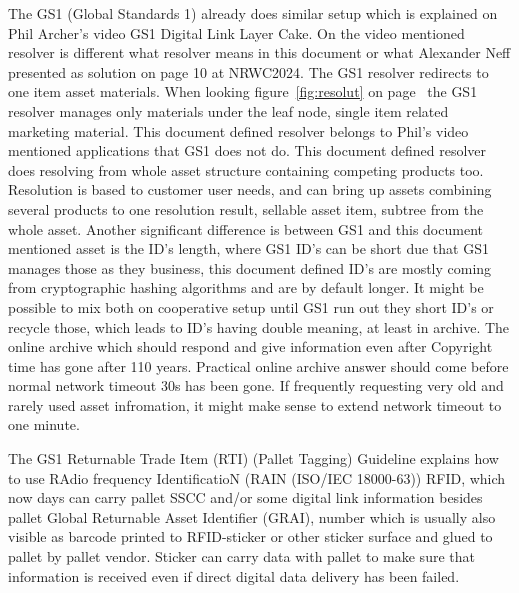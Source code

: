 The GS1 (Global Standards 1) already does similar setup which is explained
on Phil Archer's video GS1 Digital Link Layer Cake\allowbreak\cite{
GS1DigitalLink}. On the video mentioned resolver is different what resolver
means in this document or what Alexander Neff presented\allowbreak\cite{
FSW_NRWC2024} as solution on page 10 at NRWC2024. The GS1 resolver redirects
to one item asset
materials. When looking figure~\ref{fig:resolut} on page~\pageref{fig:resolut}
the GS1 resolver manages only materials under the leaf node, single item
related marketing material. This document defined resolver belongs to Phil's
video mentioned applications that GS1 does not do. This document defined
resolver does resolving from whole asset structure containing competing
products too. Resolution is based to customer user needs, and  can bring up
assets combining several products to one resolution result, sellable asset
item, subtree from the whole asset. Another significant difference is between
GS1 and this document mentioned asset is the ID's length, where GS1 ID's can
be short due that GS1 manages those as they business, this document defined
ID's are mostly coming from cryptographic hashing algorithms\allowbreak\cite{
CompHashFunc} and are by default longer. It might be possible to mix both on
cooperative setup until GS1 run out they short ID's or recycle those, which
leads to ID's having double meaning, at least in archive. The online archive
which should respond and give information even after Copyright
time\allowbreak\cite{CopyrightLengths} has gone after 110 years. Practical
online archive answer should come before normal network timeout 30s has been
gone. If frequently requesting very old and rarely used asset infromation, it
might make sense to extend network timeout to one minute.

The GS1 Returnable Trade Item (RTI)
(Pallet Tagging) Guideline\allowbreak\cite{RTIguideline}
explains how to use RAdio frequency IdentificatioN (RAIN (ISO/IEC
18000-63)) RFID\allowbreak\cite{UHFforRAIN}, which now days can carry
pallet SSCC and/or some digital link information besides pallet Global
Returnable Asset Identifier (GRAI), number which is usually also visible as
barcode printed to RFID-sticker or other sticker surface and glued to pallet
by pallet vendor\allowbreak\cite{EPalIPal}\allowbreak\cite{
AllGreenPallets}\allowbreak\cite{iGpsRFID}\allowbreak\cite{
SRSpallets}\allowbreak\cite{CraemerRFIDoption}\allowbreak\cite{ChepIcoQube}.
Sticker can carry data with pallet to make sure that information is received
even if direct digital data delivery has been failed.


